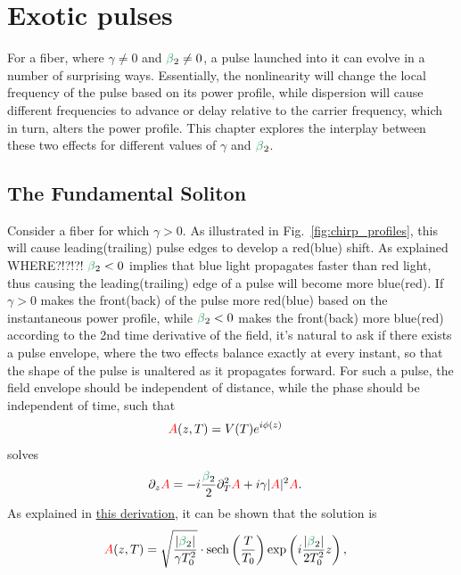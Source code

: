 \chapter{Exotic pulses}
\label{ch:Exotic}

For a fiber, where $\gamma\neq 0$ and $\betag_2\neq 0$, a pulse launched into it can evolve in a number of surprising ways. Essentially, the nonlinearity will change the local frequency of the pulse based on its power profile, while dispersion will cause different frequencies to advance or delay relative to the carrier frequency, which in turn, alters the power profile. This chapter explores the interplay between these two effects for different values of $\gamma$ and $\betag_2$. 


\section{The Fundamental Soliton}
\label{sec:soliton}
Consider a fiber for which $\gamma>0$. As illustrated in Fig.~\ref{fig:chirp_profiles}, this will cause leading(trailing) pulse edges to develop a red(blue) shift. As explained WHERE?!?!?! $\betag_2<0$ implies that blue light propagates faster than red light, thus causing the leading(trailing) edge of a pulse will become more blue(red). If $\gamma>0$ makes the front(back) of the pulse more red(blue) based on the instantaneous power profile, while $\betag_2<0$ makes the front(back) more blue(red) according to the 2nd time derivative of the field, it's natural to ask if there exists a pulse envelope, where the two effects balance exactly at every instant, so that the shape of the pulse is unaltered as it propagates forward. For such a pulse, the field envelope should be independent of distance, while the phase should be independent of time, such that
\begin{align}
    \textcolor{red}{A}(z,T) &= V(T)e^{i\phi(z)}
\end{align}
solves 
\begin{align}
\label{eq:NLSE_soliton}
    \partial_z\A &=  -i  \frac{\betag_2}{2}\partial_T^2\A+i\gamma|\A|^2\A.
\end{align}
As explained in \href{https://github.com/OleKrarup123/NLSE-vector-solver/blob/main/TutorialVideos/Soliton-Video/Fundamental_soliton_derivation.pdf}{this derivation}, it can be shown that the solution is
\begin{align}
    \A(z,T) &= \sqrt{\frac{|\betag_2|}{\gamma T_0^2}}\cdot\text{sech}\left(\frac{T}{T_0}\right)\exp\left(i\frac{|\betag_2|}{2T_0^2}z\right),
\end{align}
